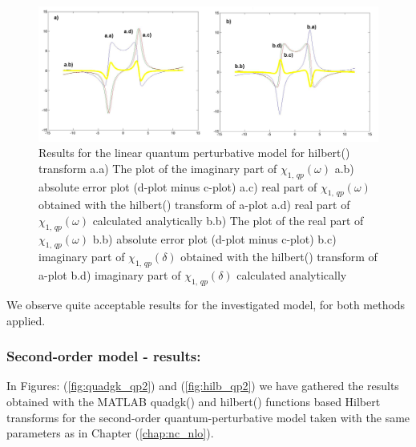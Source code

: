 \documentclass[12pt,twoside,a4paper]{article}
\numberwithin{equation}{subsection}
\numberwithin{figure}{subsection}
\begin{document}
\begin{figure}
  \includegraphics[width=150mm]{img/hilb_qp1.png}
  \caption{Results for the linear quantum perturbative model for hilbert() transform
    a.a) The plot of the imaginary part of ${\chi_{1, \, qp}}(\omega )$
    a.b) absolute error plot (d-plot minus c-plot) 
    a.c) real part of ${\chi_{1, \, qp}}(\omega )$ obtained with the hilbert()  transform of a-plot 
    a.d) real part of ${\chi_{1, \, qp}}(\omega )$ calculated analytically 
    b.b) The plot of the real part of ${\chi_{1, \, qp}}(\omega )$ 
    b.b) absolute error plot (d-plot minus c-plot) 
    b.c) imaginary part of ${\chi_{1, \, qp}}(\delta )$ obtained with the hilbert()  transform of a-plot 
    b.d) imaginary part of ${\chi_{1, \, qp}}(\delta )$ calculated analytically  
    \label{fig:hilb_qp1}
  }
\end{figure}

We observe quite acceptable results for the investigated model, for both methods applied. 

\subsubsection*{Second-order model - results:}

In Figures: (\ref{fig:quadgk_qp2}) and (\ref{fig:hilb_qp2}) we have ga\-thered the results ob\-tained with the MATLAB quadgk() and hilbert() func\-tions based Hil\-bert transforms for the se\-cond\--order quan\-tum\--per\-tur\-bative model taken with the same para\-meters as in Chapter (\ref{chap:nc_nlo}).
\end{document}
